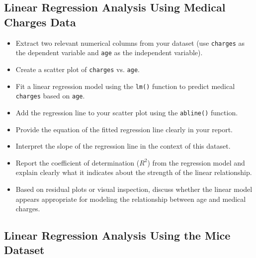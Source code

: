 \documentclass{article}
\begin{document}
\subsection*{Linear Regression Analysis Using Medical Charges Data}

\begin{itemize}
    \item Extract two relevant numerical columns from your dataset (use \texttt{charges} as the dependent variable and \texttt{age} as the independent variable).
    \item Create a scatter plot of \texttt{charges} vs. \texttt{age}.
    \item Fit a linear regression model using the \texttt{lm()} function to predict medical \texttt{charges} based on \texttt{age}.
    \item Add the regression line to your scatter plot using the \texttt{abline()} function.
    \item Provide the equation of the fitted regression line clearly in your report.
    \item Interpret the slope of the regression line in the context of this dataset.
    \item Report the coefficient of determination ($R^2$) from the regression model and explain clearly what it indicates about the strength of the linear relationship.
    \item Based on residual plots or visual inspection, discuss whether the linear model appears appropriate for modeling the relationship between age and medical charges.
\end{itemize}


\subsection*{Linear Regression Analysis Using the Mice Dataset}
\end{document}
